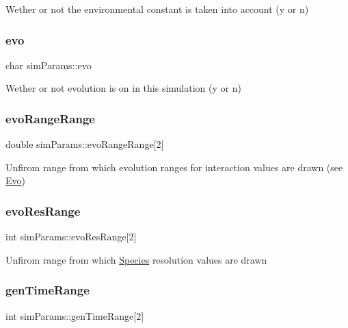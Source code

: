 Wether or not the environmental constant is taken into account (\textquotesingle{}y\textquotesingle{} or \textquotesingle{}n\textquotesingle{}) \hypertarget{structsimParams_a26cb871bb244145cf0b4d1754864f276}{}\label{structsimParams_a26cb871bb244145cf0b4d1754864f276} 
\subsubsection{\texorpdfstring{evo}{evo}}
{\footnotesize\ttfamily char sim\+Params\+::evo}

Wether or not evolution is on in this simulation (\textquotesingle{}y\textquotesingle{} or \textquotesingle{}n\textquotesingle{}) \hypertarget{structsimParams_a328c95295bd7872174fa9a22c9c402cd}{}\label{structsimParams_a328c95295bd7872174fa9a22c9c402cd} 
\subsubsection{\texorpdfstring{evo\+Range\+Range}{evoRangeRange}}
{\footnotesize\ttfamily double sim\+Params\+::evo\+Range\+Range\mbox{[}2\mbox{]}}

Unfirom range from which evolution ranges for interaction values are drawn (see \hyperlink{classEvo}{Evo}) \hypertarget{structsimParams_a4121b97ac4b40f6d309693847309ce6b}{}\label{structsimParams_a4121b97ac4b40f6d309693847309ce6b} 
\subsubsection{\texorpdfstring{evo\+Res\+Range}{evoResRange}}
{\footnotesize\ttfamily int sim\+Params\+::evo\+Res\+Range\mbox{[}2\mbox{]}}

Unfirom range from which \hyperlink{classSpecies}{Species} resolution values are drawn \hypertarget{structsimParams_ace2069f1d65920fe32e4236c12e91ea9}{}\label{structsimParams_ace2069f1d65920fe32e4236c12e91ea9} 
\subsubsection{\texorpdfstring{gen\+Time\+Range}{genTimeRange}}
{\footnotesize\ttfamily int sim\+Params\+::gen\+Time\+Range\mbox{[}2\mbox{]}}

